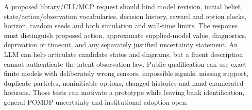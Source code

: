 A proposed library/CLI/MCP request should bind model revision, initial belief,
state/action/observation vocabularies, decision history, reward and option clocks,
horizon, random seeds and both simulation and wall-time limits. The response
must distinguish proposed action, approximate supplied-model value, diagnostics,
deprivation or timeout, and any separately justified uncertainty statement.
An LLM can help articulate candidate states and diagrams, but a fluent
description cannot authenticate the latent observation law. Public qualification
can use exact finite models with deliberately wrong sensors, impossible signals,
missing support, duplicate particles, noninitiable options, changed histories
and hand-enumerated horizons. Those tests can motivate a prototype while leaving
bank identification, general POMDP uncertainty and institutional adoption open.
